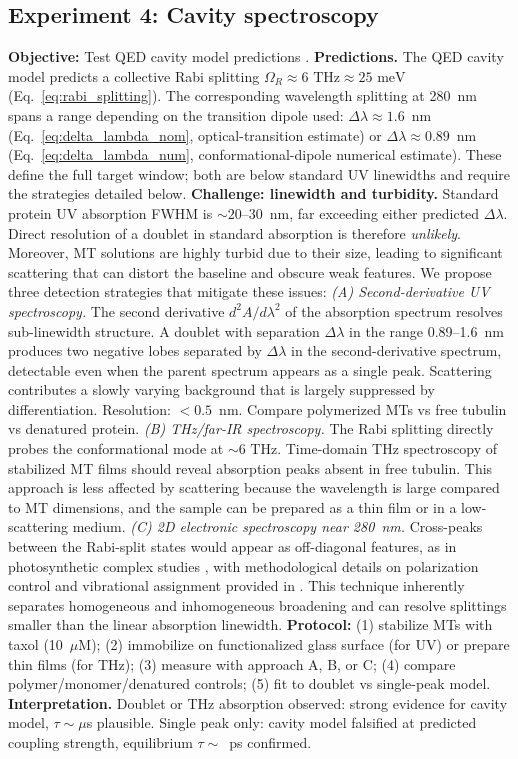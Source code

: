 \documentclass[twocolumn,10pt]{article}
\newcommand{\meV}{\text{~meV}}
\newcommand{\THz}{\text{~THz}}
\begin{document}
\subsection{Experiment 4: Cavity spectroscopy}
\label{sec:exp4}
\textbf{Objective:} Test QED cavity model predictions \cite{Mavromatos2025}.
\textbf{Predictions.} The QED cavity model predicts a collective Rabi
splitting $\Omega_R \approx 6\THz \approx 25\meV$ (Eq.~\ref{eq:rabi_splitting}).
The corresponding wavelength splitting at 280~nm spans a range depending
on the transition dipole used: $\Delta\lambda \approx 1.6$~nm
(Eq.~\ref{eq:delta_lambda_nom}, optical-transition estimate) or
$\Delta\lambda \approx 0.89$~nm (Eq.~\ref{eq:delta_lambda_num},
conformational-dipole numerical estimate). These define the full target
window; both are below standard UV linewidths and require the strategies
detailed below.
\textbf{Challenge: linewidth and turbidity.} Standard protein UV
absorption FWHM is $\sim 20\text{--}30$~nm, far exceeding either predicted
$\Delta\lambda$. Direct resolution of a doublet in standard absorption is
therefore \textit{unlikely}. Moreover, MT solutions are highly turbid due
to their size, leading to significant scattering that can distort the
baseline and obscure weak features. We propose three detection strategies
that mitigate these issues:
\textit{(A) Second-derivative UV spectroscopy.} The second derivative
$d^2A/d\lambda^2$ of the absorption spectrum resolves sub-linewidth
structure. A doublet with separation $\Delta\lambda$ in the range
0.89--1.6~nm produces two negative lobes separated by $\Delta\lambda$ in
the second-derivative spectrum, detectable even when the parent spectrum
appears as a single peak. Scattering contributes a slowly varying
background that is largely suppressed by differentiation. Resolution:
$< 0.5$~nm. Compare polymerized MTs vs free tubulin vs denatured protein.
\textit{(B) THz/far-IR spectroscopy.} The Rabi splitting directly probes
the conformational mode at $\sim 6\THz$. Time-domain THz spectroscopy of
stabilized MT films should reveal absorption peaks absent in free
tubulin. This approach is less affected by scattering because the
wavelength is large compared to MT dimensions, and the sample can be
prepared as a thin film or in a low-scattering medium.
\textit{(C) 2D electronic spectroscopy near 280~nm.} Cross-peaks between
the Rabi-split states would appear as off-diagonal features, as in
photosynthetic complex studies \cite{Thyrhaug2018,Thyrhaug2018b}, with methodological details on polarization control and vibrational assignment provided in \cite{Thyrhaug2018b}. This technique
inherently separates homogeneous and inhomogeneous broadening and can
resolve splittings smaller than the linear absorption linewidth.
\textbf{Protocol:} (1) stabilize MTs with taxol (10~$\mu$M); (2) immobilize
on functionalized glass surface (for UV) or prepare thin films (for THz);
(3) measure with approach A, B, or C; (4) compare polymer/monomer/denatured
controls; (5) fit to doublet vs single-peak model.
\textbf{Interpretation.} Doublet or THz absorption observed: strong
evidence for cavity model, $\tau \sim \mu$s plausible. Single peak only:
cavity model falsified at predicted coupling strength, equilibrium
$\tau \sim$~ps confirmed.
\end{document}
